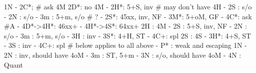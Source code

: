1N - 2C*;  # ask 4M
2D*: no 4M
   - 2H*: 5+S, inv  # may don't have 4H
		- 2S : s/o
		- 2N : s/o
			 - 3m : 5+m, s/o  # ?
   - 2S*: 45xx, inv, NF
   - 3M*: 5+oM, GF
   - 4C*: ask #A
   - 4D*->4H*: 46xx+
   - 4H*->4S*: 64xx+
2H : 4M
   - 2S : 5+S, inv, NF
		- 2N : s/o
			 - 3m : 5+m, s/o
   - 3H : inv
   - 3S*: 4+H, ST
   - 4C+: spl
2S : 4S
   - 3H*: 4+S, ST
   - 3S : inv
   - 4C+: spl
# below applies to all above
   - P* : weak and escaping 1N
   - 2N : inv, should have 4oM
   - 3m : ST, 5+m
   - 3N : s/o, should have 4oM
   - 4N : Quant


